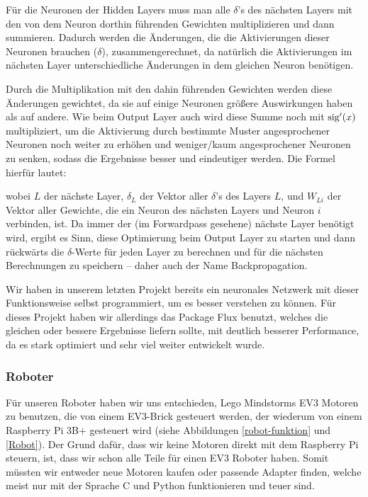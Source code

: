 \documentclass[11pt]{scrartcl}
\begin{document}
	Für die Neuronen der Hidden Layers muss man alle $\delta$'s des nächsten Layers mit den von dem Neuron dorthin führenden Gewichten multiplizieren und dann summieren. Dadurch werden die Änderungen, die die Aktivierungen dieser Neuronen brauchen ($\delta$), zusammengerechnet, da natürlich die Aktivierungen im nächsten Layer unterschiedliche Änderungen in dem gleichen Neuron benötigen.
	
	Durch die Multiplikation mit den dahin führenden Gewichten werden diese Änderungen gewichtet, da sie auf einige Neuronen größere Auswirkungen haben als auf andere. Wie beim Output Layer auch wird diese Summe noch mit $\textrm{sig}'(x)$ multipliziert, um die Aktivierung durch bestimmte Muster angesprochener Neuronen noch weiter zu erhöhen und weniger/kaum angesprochener Neuronen zu senken, sodass die Ergebnisse besser und eindeutiger werden. Die Formel hierfür lautet:

%
	\noindent wobei $L$ der nächste Layer, $\delta_L$ der Vektor aller $\delta$'s des Layers $L$, und $W_{Li}$ der Vektor aller Gewichte, die ein Neuron des nächsten Layers und Neuron $i$ verbinden, ist.
%
	Da immer der (im Forwardpass gesehene) nächste Layer benötigt wird, ergibt es Sinn, diese Optimierung beim Output Layer zu starten und dann rückwärts die \mbox{$\delta$-Werte} für jeden Layer zu berechnen und für die nächsten Berechnungen zu speichern -- daher auch der Name Backpropagation. \cite{MITNeuronale} \cite{3b1b:nn} \cite{brotcrunsher:backwardpass}


	Wir haben in unserem letzten Projekt bereits ein neuronales Netzwerk mit dieser Funktionsweise selbst programmiert, um es besser verstehen zu können. \cite{AIComposer} Für dieses Projekt haben wir allerdings das Package Flux benutzt, welches die gleichen oder bessere Ergebnisse liefern sollte, mit deutlich besserer Performance, da es stark optimiert und sehr viel weiter entwickelt wurde. \cite{Flux.jl-2018}

	\subsubsection{Roboter}

	Für unseren Roboter haben wir uns entschieden, Lego Mindstorms EV3 Motoren zu benutzen, die von einem EV3-Brick gesteuert werden, der wiederum von einem Raspberry Pi 3B+ gesteuert wird (siehe Abbildungen \ref{robot-funktion} und \ref{Robot}). Der Grund dafür, dass wir keine Motoren direkt mit dem Raspberry Pi steuern, ist, dass wir schon alle Teile für einen EV3 Roboter haben. Somit müssten wir entweder neue Motoren kaufen oder passende Adapter finden, welche meist nur mit der Sprache C und Python funktionieren und teuer sind.
\end{document}
